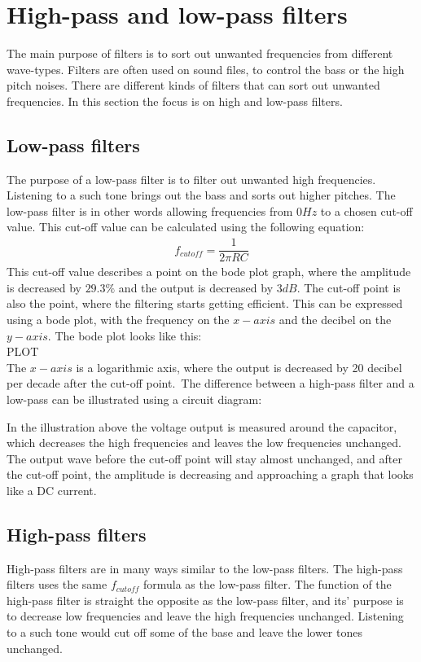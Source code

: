 \chapter{High-pass and low-pass filters}
The main purpose of filters is to sort out unwanted frequencies from different wave-types. Filters are often used on sound files, to control the bass or the high pitch noises. There are different kinds of filters that can sort out unwanted frequencies. In this section the focus is on high and low-pass filters.

\section{Low-pass filters}
The purpose of a low-pass filter is to filter out unwanted high frequencies. Listening to a such tone brings out the bass and sorts out higher pitches. The low-pass filter is in other words allowing frequencies from $0Hz$ to a chosen cut-off value. This cut-off value can be calculated using the following equation:
\begin{align*}
f_{cutoff}=\dfrac{1}{2 \pi RC}
\end{align*}
This cut-off value describes a point on the bode plot graph, where the amplitude is decreased by $29.3\%$ and the output is decreased by $3dB$. The cut-off point is also the point, where the filtering starts getting efficient. This can be expressed using a bode plot, with the frequency on the $x-axis$ and the decibel on the $y-axis$. The bode plot looks like this: \\
PLOT \\
The $x-axis$ is a logarithmic axis, where the output is decreased by 20 decibel per decade after the cut-off point.\
The difference between a high-pass filter and a low-pass can be illustrated using a circuit diagram:
\begin{figure}[H]
	
\end{figure}
In the illustration above the voltage output is measured around the capacitor, which decreases the high frequencies and leaves the low frequencies unchanged. The output wave before the cut-off point will stay almost unchanged, and after the cut-off point, the amplitude is decreasing and approaching a graph that looks like a DC current. 

\section{High-pass filters}
High-pass filters are in many ways similar to the low-pass filters. The high-pass filters uses the same $f_{cutoff}$ formula as the low-pass filter. The function of the high-pass filter is straight the opposite as the low-pass filter, and its' purpose is to decrease low frequencies and leave the high frequencies unchanged. Listening to a such tone would cut off some of the base and leave the lower tones unchanged. \\


